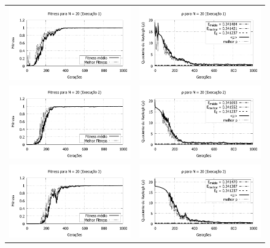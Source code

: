 		\begin{figure}[p]
	\centering
  \begin{tabular}{@{}cc@{}}
		\includegraphics[width=.40\textwidth]{figs/resultados/fitnessEL/N-20_E-1_fitness-extendido.pdf} &
    \includegraphics[width=.40\textwidth]{figs/resultados/fitnessEL/N-20_E-1_rho_extendido.pdf}   \\
		\includegraphics[width=.40\textwidth]{figs/resultados/fitnessEL/N-20_E-2_fitness-extendido.pdf} &
    \includegraphics[width=.40\textwidth]{figs/resultados/fitnessEL/N-20_E-2_rho_extendido.pdf}   \\
		\includegraphics[width=.40\textwidth]{figs/resultados/fitnessEL/N-20_E-3_fitness-extendido.pdf} &
    \includegraphics[width=.40\textwidth]{figs/resultados/fitnessEL/N-20_E-3_rho_extendido.pdf}   \\

\end{tabular}
\end{figure}
